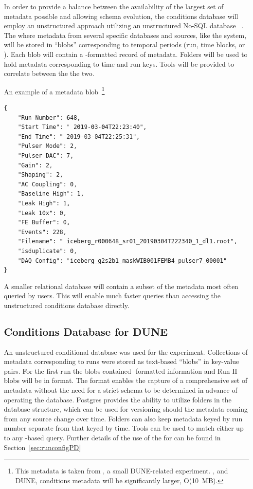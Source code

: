 \documentclass[../main-v1.tex]{subfiles}
\begin{document}
In order to provide a balance between the availability of the largest set of metadata possible  and allowing schema evolution,  the conditions database will employ an unstructured approach utilizing an unstructured No-SQL database ~\cite{bib:ucondb}. The  where metadata from several specific databases and sources, like the  system, will be stored in ``blobs'' corresponding to temporal periods (run, time blocks, or ). Each blob will contain a -formatted record of metadata. Folders will be used to hold metadata corresponding to time and run keys. Tools will be provided to correlate between the the two. 

An example of a metadata blob~\footnote{This metadata is taken from , a small DUNE-related experiment. , and DUNE, conditions metadata will be significantly larger, O(10~MB).}

\begin{verbatim}
{
    "Run Number": 648,
    "Start Time": " 2019-03-04T22:23:40",
    "End Time": " 2019-03-04T22:25:31",
    "Pulser Mode": 2,
    "Pulser DAC": 7,
    "Gain": 2,
    "Shaping": 2,
    "AC Coupling": 0,
    "Baseline High": 1,
    "Leak High": 1,
    "Leak 10x": 0,
    "FE Buffer": 0,
    "Events": 228,
    "Filename": " iceberg_r000648_sr01_20190304T222340_1_dl1.root",
    "isduplicate": 0,
    "DAQ Config": "iceberg_g2s2b1_maskWIB001FEMB4_pulser7_00001"
}
\end{verbatim}

A smaller relational database will contain a subset of the metadata most often queried by users. This will enable much faster queries than accessing the unstructured conditions database directly.

\subsection{Conditions Database for DUNE}

An unstructured conditional database was used for the  experiment. Collections of metadata corresponding to  runs were stored as text-based ``blobs'' in key-value pairs. For the first  run the blobs contained -formatted information and Run II blobs will be in  format. The  format enables the capture of a comprehensive set of metadata without the need for a strict schema to be determined in advance of operating the database. Postgres provides the ability to utilize folders in the database structure, which can be used for versioning should the metadata coming from any source change over time. Folders can also keep metadata keyed by run number separate from that keyed by time. Tools can be used to match either up to any -based query. Further details of the use of the  for  can be found in Section~\ref{sec:runconfigPD} 
\end{document}
